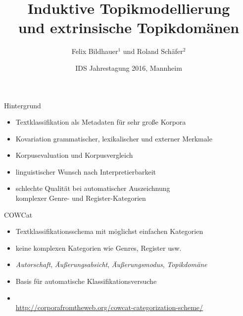 \documentclass{beamer}
\title[Topikmodellierung und -domänen]{Induktive Topikmodellierung\\und extrinsische Topikdomänen}
\author[Felix Bildhauer, Roland Schäfer]{Felix Bildhauer$^1$ und Roland Schäfer$^2$}
\institute[]{$^1$Abt.\ Grammatik IDS Mannheim, $^2$Ling.\ Webcharakterisierung (DFG) FU Berlin}
\date[]{IDS Jahrestagung 2016, Mannheim}
\begin{document}
\frame{\titlepage}

\begin{frame}
  {Hintergrund}
  \begin{itemize}
    \item \alert{Textklassifikation} als \alert{Metadaten} für sehr große Korpora
    \item \alert{Kovariation} grammatischer, lexikalischer und externer Merkmale
    \item \alert{Korpusevaluation} und Korpusvergleich\\
      \citep{Kilgarriff2001,BiemannEa2013,SchaeferBildhauer2013de}
    \item linguistischer Wunsch nach \alert{Interpretierbarkeit}
    \item schlechte Qualität bei automatischer Auszeichnung\\
      komplexer Genre- und Register-Kategorien \citep{BiberEgbert2016}
  \end{itemize}
\end{frame}

\begin{frame}
  {COWCat}
  \begin{itemize}
    \item Textklassifikationsschema mit möglichst einfachen Kategorien
    \item keine komplexen Kategorien wie Genres, Register usw.
    \item \textit{Autorschaft}, \textit{Äußerungsabsicht}, \textit{Äußerungsmodus}, \alert{\textit{Topikdomäne}}
      \vspace{0.5cm}
    \item Basis für automatische Klassifikationsversuche
      \vspace{0.5cm}
    \item \cite{Sharoff2006,SchaeferBildhauer2012a}\\
      {\footnotesize \url{http://corporafromtheweb.org/cowcat-categorization-scheme/}}
  \end{itemize}
\end{frame}
\end{document}
